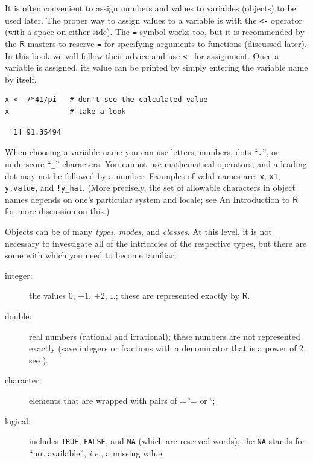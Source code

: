 \documentclass[captions=tableheading]{scrbook}
\begin{document}
It is often convenient to assign numbers and values to variables (objects) to be used later. The proper way to assign values to a variable is with the \texttt{<-} operator (with a space on either side). The \verb~=~ symbol works too, but it is recommended by the \(\mathsf{R}\) masters to reserve \verb~=~ for specifying arguments to functions (discussed later). In this book we will follow their advice and use \texttt{<-} for assignment. Once a variable is assigned, its value can be printed by simply entering the variable name by itself.


\lstset{language=R}
\begin{lstlisting}
x <- 7*41/pi   # don't see the calculated value
x              # take a look
\end{lstlisting}

\begin{verbatim}
 [1] 91.35494
\end{verbatim}

When choosing a variable name you can use letters, numbers, dots ``\texttt{.}'', or underscore ``\texttt{\_}'' characters. You cannot use mathematical operators, and a leading dot may not be followed by a number. Examples of valid names are: \texttt{x}, \texttt{x1}, \texttt{y.value}, and \texttt{!y\_hat}. (More precisely, the set of allowable characters in object names depends on one's particular system and locale; see An Introduction to \(\mathsf{R}\) for more discussion on this.)

Objects can be of many \emph{types}, \emph{modes}, and \emph{classes}. At this level, it is not necessary to investigate all of the intricacies of the respective types, but there are some with which you need to become familiar:

\begin{description}
\item[integer:] the values \(0\), \(\pm1\), \(\pm2\), \ldots{}; these are represented exactly by \(\mathsf{R}\).
\item[double:] real numbers (rational and irrational); these numbers are not represented exactly (save integers or fractions with a denominator that is a power of 2, see \cite{Venables2010}).
\item[character:] elements that are wrapped with pairs of =''= or `;
\item[logical:] includes \texttt{TRUE}, \texttt{FALSE}, and \texttt{NA} (which are reserved words); the \texttt{NA} stands for ``not available'', \emph{i.e.}, a missing value.
\end{description}
\end{document}
